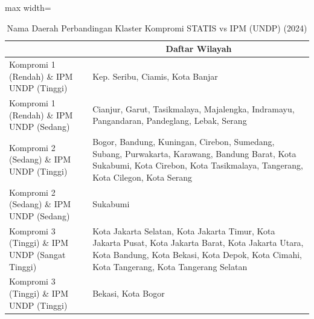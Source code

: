 \begin{table}[H]
\centering
\caption{Nama Daerah Perbandingan Klaster Kompromi STATIS vs IPM (UNDP) (2024)} \label{tab:app2comp_ipm_name_2024}
\begin{adjustbox}{max width=\textwidth}
\begin{tabular}{|>{\centering\arraybackslash}p{4cm}|p{10cm}|}
\hline
\multicolumn{1}{|c|}{\textbf{Kategori}} & \multicolumn{1}{c|}{\textbf{Daftar Wilayah}} \\
\hline
Kompromi 1 (Rendah) \& IPM UNDP (Tinggi) & Kep. Seribu, Ciamis, Kota Banjar \\
\hline
Kompromi 1 (Rendah) \& IPM UNDP (Sedang) & Cianjur, Garut, Tasikmalaya, Majalengka, Indramayu, Pangandaran, Pandeglang, Lebak, Serang \\
\hline
Kompromi 2 (Sedang) \& IPM UNDP (Tinggi) & Bogor, Bandung, Kuningan, Cirebon, Sumedang, Subang, Purwakarta, Karawang, Bandung Barat, Kota Sukabumi, Kota Cirebon, Kota Tasikmalaya, Tangerang, Kota Cilegon, Kota Serang \\
\hline
Kompromi 2 (Sedang) \& IPM UNDP (Sedang) & Sukabumi \\
\hline
Kompromi 3 (Tinggi) \& IPM UNDP (Sangat Tinggi) & Kota Jakarta Selatan, Kota Jakarta Timur, Kota Jakarta Pusat, Kota Jakarta Barat, Kota Jakarta Utara, Kota Bandung, Kota Bekasi, Kota Depok, Kota Cimahi, Kota Tangerang, Kota Tangerang Selatan \\
\hline
Kompromi 3 (Tinggi) \& IPM UNDP (Tinggi) & Bekasi, Kota Bogor \\
\hline
\end{tabular}
\end{adjustbox}
\end{table}